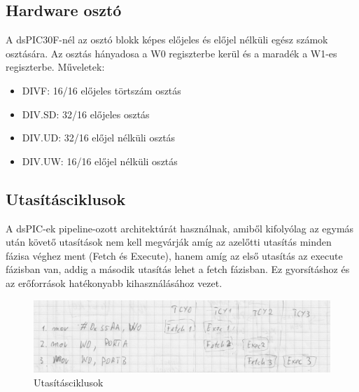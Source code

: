 \subsection{Hardware osztó}

A dsPIC30F-nél az osztó blokk képes előjeles és előjel nélküli egész számok osztására. Az osztás hányadosa a W0 regiszterbe kerül és a maradék a W1-es regiszterbe. Műveletek:

\begin{itemize}
    \item DIVF: 16/16 előjeles törtszám osztás
    \item DIV.SD: 32/16 előjeles osztás
    \item DIV.UD: 32/16 előjel nélküli osztás
    \item DIV.UW: 16/16 előjel nélküli osztás
\end{itemize}

\subsection{Utasításciklusok}

A dsPIC-ek pipeline-ozott architektúrát használnak, amiből kifolyólag az egymás után követő utasítások nem kell megvárják amíg az azelőtti utasítás minden fázisa véghez ment (Fetch és Execute), hanem amíg az első utasítás az execute fázisban van, addig a második utasítás lehet a fetch fázisban. Ez gyorsításhoz és az erőforrások hatékonyabb kihasználásához vezet.

\begin{figure}[H]
    \centering
    \includegraphics[scale=0.25]{figures/dsp_fetch_ex.jpg}
    \caption{Utasításciklusok}
\end{figure}
